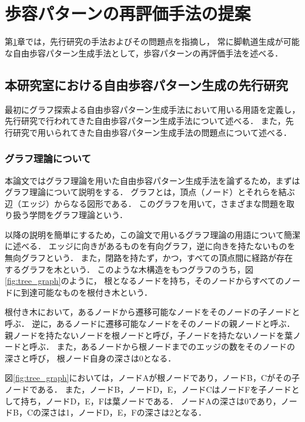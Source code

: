 ﻿%


\chapter{歩容パターンの再評価手法の提案}\label{chapter:歩容パターンの再評価手法の提案}
第\ref{chapter:歩容パターンの再評価手法の提案}章では，先行研究の手法およびその問題点を指摘し，
常に脚軌道生成が可能な自由歩容パターン生成手法として，歩容パターンの再評価手法を述べる．

\section{本研究室における自由歩容パターン生成の先行研究}
最初にグラフ探索よる自由歩容パターン生成手法において用いる用語を定義し，
先行研究で行われてきた自由歩容パターン生成手法について述べる．
また，先行研究で用いられてきた自由歩容パターン生成手法の問題点について述べる．

\subsection{グラフ理論について}
本論文ではグラフ理論を用いた自由歩容パターン生成手法を論ずるため，まずはグラフ理論について説明をする．
グラフとは，頂点（ノード）とそれらを結ぶ辺（エッジ）からなる図形である．
このグラフを用いて，さまざまな問題を取り扱う学問をグラフ理論という．

以降の説明を簡単にするため，この論文で用いるグラフ理論の用語について簡潔に述べる．
エッジに向きがあるものを有向グラフ，逆に向きを持たないものを無向グラフという．
また，閉路を持たず，かつ，すべての頂点間に経路が存在するグラフを木という．
このような木構造をもつグラフのうち，図\ref*{fig:tree_graph}のように，
根となるノードを持ち，そのノードからすべてのノードに到達可能なものを根付き木という．

根付き木において，あるノードから遷移可能なノードをそのノードの子ノードと呼ぶ．
逆に，あるノードに遷移可能なノードをそのノードの親ノードと呼ぶ．
親ノードを持たないノードを根ノードと呼び，子ノードを持たないノードを葉ノードと呼ぶ．
また，あるノードから根ノードまでのエッジの数をそのノードの深さと呼び，
根ノード自身の深さは0となる．

図\ref*{fig:tree_graph}においては，ノードAが根ノードであり，ノードB，Cがその子ノードである．
また，ノードB，ノードD，E，ノードCはノードFを子ノードとして持ち，ノードD，E，Fは葉ノードである．
ノードAの深さは0であり，ノードB，Cの深さは1，ノードD，E，Fの深さは2となる．

